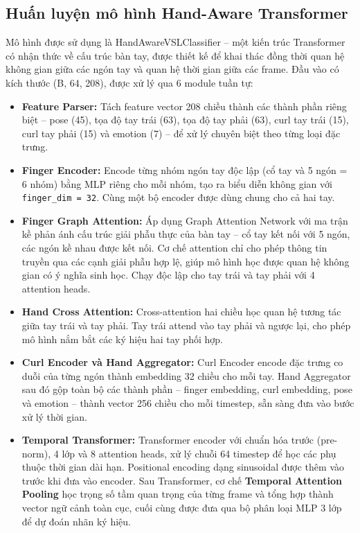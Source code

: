 \subsection{Huấn luyện mô hình Hand-Aware Transformer}

Mô hình được sử dụng là HandAwareVSLClassifier -- một kiến trúc
Transformer có nhận thức về cấu trúc bàn tay, được thiết kế để khai thác đồng
thời quan hệ không gian giữa các ngón tay và quan hệ thời gian giữa các frame.
Đầu vào có kích thước (B, 64, 208), được xử lý qua 6 module tuần tự:

\begin{itemize}
    \item \textbf{Feature Parser:} Tách feature vector 208 chiều thành các thành
    phần riêng biệt -- pose (45), tọa độ tay trái (63), tọa độ tay phải (63),
    curl tay trái (15), curl tay phải (15) và emotion (7) -- để xử lý chuyên
    biệt theo từng loại đặc trưng.

    \item \textbf{Finger Encoder:} Encode từng nhóm ngón tay độc lập (cổ tay và
    5 ngón = 6 nhóm) bằng MLP riêng cho mỗi nhóm, tạo ra biểu diễn không gian
    với \texttt{finger\_dim = 32}. Cùng một bộ encoder được dùng chung cho cả
    hai tay.

    \item \textbf{Finger Graph Attention:} Áp dụng Graph Attention Network
    với ma trận kề phản ánh cấu trúc giải phẫu thực của bàn tay -- cổ tay kết
    nối với 5 ngón, các ngón kề nhau được kết nối. Cơ chế attention chỉ cho phép
    thông tin truyền qua các cạnh giải phẫu hợp lệ, giúp mô hình học được quan
    hệ không gian có ý nghĩa sinh học. Chạy độc lập cho tay trái và tay phải với
    4 attention heads.

    \item \textbf{Hand Cross Attention:} Cross-attention hai chiều học quan hệ
    tương tác giữa tay trái và tay phải. Tay trái attend vào tay phải và ngược
    lại, cho phép mô hình nắm bắt các ký hiệu hai tay phối hợp.

    \item \textbf{Curl Encoder và Hand Aggregator:} Curl Encoder encode đặc trưng
    co duỗi của từng ngón thành embedding 32 chiều cho mỗi tay. Hand Aggregator
    sau đó gộp toàn bộ các thành phần -- finger embedding, curl embedding, pose
    và emotion -- thành vector 256 chiều cho mỗi timestep, sẵn sàng
    đưa vào bước xử lý thời gian.

    \item \textbf{Temporal Transformer:} Transformer encoder với chuẩn hóa
    trước (pre-norm), 4 lớp và 8 attention heads, xử lý chuỗi 64 timestep để
    học các phụ thuộc thời gian dài hạn. Positional encoding dạng sinusoidal
    được thêm vào trước khi đưa vào encoder. Sau Transformer, cơ chế
    \textbf{Temporal Attention Pooling} học trọng số tầm quan trọng của từng
    frame và tổng hợp thành vector ngữ cảnh toàn cục, cuối cùng được đưa qua
    bộ phân loại MLP 3 lớp để dự đoán nhãn ký hiệu.
\end{itemize}

